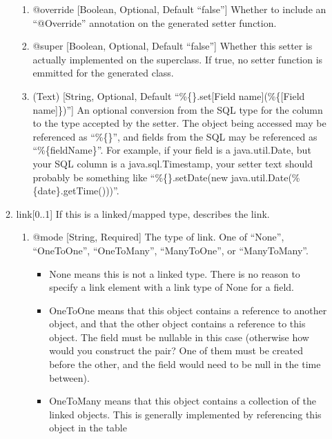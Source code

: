 \documentclass{book}
\begin{document}
\begin{enumerate}
\begin{enumerate}
\begin{enumerate}
            \item @override [Boolean, Optional, Default ``false''] Whether to
                  include an ``@Override'' annotation on the generated setter
                  function.
            \item @super [Boolean, Optional, Default ``false''] Whether this
                  setter is actually implemented on the superclass. If true,
                  no setter function is emmitted for the generated class.
            \item (Text) [String, Optional, Default
                  ``\%\{\}.set[Field name](\%\{[Field name]\})''] An optional
                  conversion from the SQL type for the column to the type
                  accepted by the setter. The object being accessed may be
                  referenced as ``\%\{\}'', and fields from the SQL may be
                  referenced as ``\%\{fieldName\}''. For example, if your field
                  is a java.util.Date, but your SQL column is a
                  java.sql.Timestamp, your setter text should probably be
                  something like
                  ``\%\{\}.setDate(new java.util.Date(\%\{date\}.getTime()))''.
        \end{enumerate}
        \item link[0..1] If this is a linked/mapped type, describes the link.
        \begin{enumerate}
            \item @mode [String, Required] The type of link. One of ``None'',
                  ``OneToOne'', ``OneToMany'', ``ManyToOne'', or ``ManyToMany''.
            \begin{itemize}
                \item None means this is not a linked type. There is no
                reason to specify a link element with a link type of None
                for a field.
                \item OneToOne means that this object contains a reference
                to another object, and that the other object contains a
                reference to this object. The field must be nullable in
                this case (otherwise how would you construct the pair? One
                of them must be created before the other, and the field
                would need to be null in the time between).
                \item OneToMany means that this object contains a
                collection of the linked objects. This is generally
                implemented by referencing this object in the table

\end{itemize}
\end{enumerate}
\end{enumerate}
\end{enumerate}
\end{document}
